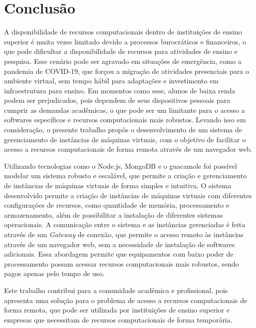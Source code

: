 \chapter{Conclus\~ao}\label{cap:conclusao}


A disponibilidade de recursos computacionais dentro de instituições de ensino superior é muita vezes limitado devido a processos burocráticos e financeiros, o que pode dificultar a disponibilidade de recursos para atividades de ensino e pesquisa. Esse cenário pode ser agravado em situações de emergência, como a pandemia de COVID-19, que forçou a migração de atividades presenciais para o ambiente virtual, sem tempo hábil para adaptações e investimento em infraestrutura para ensino. Em momentos como esse, alunos de baixa renda podem ser prejudicados, pois dependem de seus dispositivos pessoais para cumprir as demandas acadêmicas, o que pode ser um limitante para o acesso a softwares específicos e recursos computacionais mais robustos. Levando isso em consideração, o presente trabalho propôs o desenvolvimento de um sistema de gerenciamento de instâncias de máquinas virtuais, com o objetivo de facilitar o acesso a recursos computacionais de forma remota através de um navegador web.

Utilizando tecnologias como o Node.js, MongoDB e o \gls{guacamole} foi possível modelar um sistema robusto e escalável, que permite a criação e gerenciamento de instâncias de máquinas virtuais de forma simples e intuitiva. O sistema desenvolvido permite a criação de instâncias de máquinas virtuais com diferentes configurações de recursos, como quantidade de memória, processamento e armazenamento, além de possibilitar a instalação de diferentes sistemas operacionais. A comunicação entre o sistema e as instâncias gerenciadas é feita através de um \textit{Gateway} de conexão, que permite o acesso remoto às instâncias através de um navegador web, sem a necessidade de instalação de softwares adicionais. Essa abordagem permite que equipamentos com baixo poder de processamento possam acessar recursos computacionais mais robustos, sendo pagos apenas pelo tempo de uso.

Este trabalho contribui para a comunidade acadêmica e profissional, pois apresenta uma solução para o problema de acesso a recursos computacionais de forma remota, que pode ser utilizada por instituições de ensino superior e empresas que necessitam de recursos computacionais de forma temporária.

